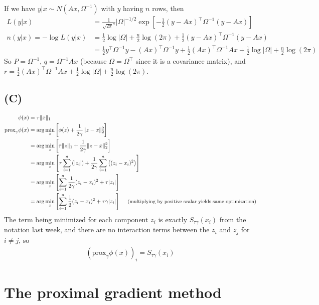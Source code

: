 \documentclass{article}
\begin{document}
If we have $ y | x \sim N(Ax, \Omega^{-1})$ with $y$ having $n$ rows, then
\begin{align*}
L(y | x)&=\frac{1}{\sqrt{2\pi}^n} |\Omega|^{-1/2} \exp\left[- \frac{1}{2}(y-Ax)^\top \Omega^{-1} (y-Ax)\right]\\
n(y|x)=-\log L(y|x)&=\frac{1}{2}\log |\Omega| +\frac{n}{2}\log(2\pi) + \frac{1}{2}(y-Ax)^\top \Omega^{-1} (y-Ax)\\
&=\frac{1}{2}y^\top \Omega^{-1} y - (Ax)^\top\Omega^{-1} y + \frac{1}{2}(Ax)^\top\Omega^{-1} Ax + \frac{1}{2}\log |\Omega| +\frac{n}{2}\log(2\pi)
\end{align*}
So $P=\Omega^{-1}$, $q=\Omega^{-1}Ax$ (because $\Omega=\Omega^\top$ since it is a covariance matrix), and $r=\frac{1}{2}(Ax)^\top\Omega^{-1} Ax + \frac{1}{2}\log |\Omega| +\frac{n}{2}\log(2\pi)$.


\subsection{(C)}
\label{sec:1c}
\begin{align*}
\phi(x)&=\tau \lVert x\rVert_1\\
\textrm{prox}_\gamma \phi(x)&=\arg\min_z \left[ \phi(z) + \frac{1}{2\gamma} \lVert z-x\rVert_2^2 \right]\\
&=\arg\min_z \left[ \tau \lVert z \rVert_1 + \frac{1}{2\gamma} \lVert z-x\rVert_2^2 \right]\\
&=\arg\min_z \left[ \tau \sum_{i=1}^n \left(|z_i|\right) + \frac{1}{2\gamma} \sum_{i=1}^n\left( (z_i-x_i)^2 \right) \right]\\
&=\arg\min_z \left[\sum_{i=1}^n \frac{1}{2\gamma}(z_i-x_i)^2 + \tau |z_i| \right]\\
&=\arg\min_z \left[\sum_{i=1}^n \frac{1}{2}(z_i-x_i)^2 + \tau\gamma |z_i| \right]~~~~{\small\textrm{(multiplying by positive scalar yields same optimization)}}
\end{align*}
The term being minimized for each component $z_i$ is exactly $S_{\tau\gamma}(x_i)$ from the notation last week, and
there are no interaction terms between the $z_i$ and $z_j$ for $i\neq j$, so
\begin{align*}
\left(\textrm{prox}_\gamma \phi(x)\right)_i=S_{\tau\gamma}(x_i)
\end{align*}


\section{The proximal gradient method}
\end{document}
